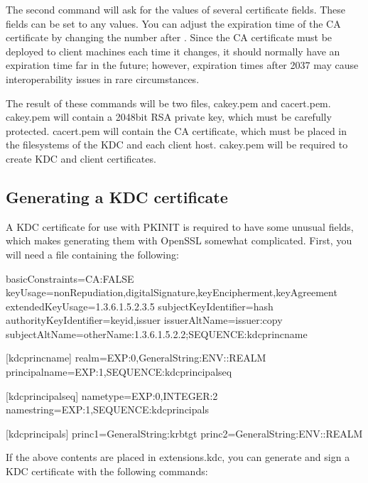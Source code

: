 \documentclass[letterpaper,10pt,english]{sphinxmanual}
\begin{document}
\sphinxAtStartPar
The second command will ask for the values of several certificate
fields.  These fields can be set to any values.  You can adjust the
expiration time of the CA certificate by changing the number after
.  Since the CA certificate must be deployed to client
machines each time it changes, it should normally have an expiration
time far in the future; however, expiration times after 2037 may cause
interoperability issues in rare circumstances.

\sphinxAtStartPar
The result of these commands will be two files, cakey.pem and
cacert.pem.  cakey.pem will contain a 2048\sphinxhyphen{}bit RSA private key, which
must be carefully protected.  cacert.pem will contain the CA
certificate, which must be placed in the filesystems of the KDC and
each client host.  cakey.pem will be required to create KDC and client
certificates.


\subsection{Generating a KDC certificate}
\label{\detokenize{admin/pkinit:generating-a-kdc-certificate}}
\sphinxAtStartPar
A KDC certificate for use with PKINIT is required to have some unusual
fields, which makes generating them with OpenSSL somewhat complicated.
First, you will need a file containing the following:

\begin{sphinxVerbatim}
basicConstraints=CA:FALSE
keyUsage=nonRepudiation,digitalSignature,keyEncipherment,keyAgreement
extendedKeyUsage=1.3.6.1.5.2.3.5
subjectKeyIdentifier=hash
authorityKeyIdentifier=keyid,issuer
issuerAltName=issuer:copy
subjectAltName=otherName:1.3.6.1.5.2.2;SEQUENCE:kdc\PYGZus{}princ\PYGZus{}name

[kdc\PYGZus{}princ\PYGZus{}name]
realm=EXP:0,GeneralString:\PYGZdl{}\PYGZob{}ENV::REALM\PYGZcb{}
principal\PYGZus{}name=EXP:1,SEQUENCE:kdc\PYGZus{}principal\PYGZus{}seq

[kdc\PYGZus{}principal\PYGZus{}seq]
name\PYGZus{}type=EXP:0,INTEGER:2
name\PYGZus{}string=EXP:1,SEQUENCE:kdc\PYGZus{}principals

[kdc\PYGZus{}principals]
princ1=GeneralString:krbtgt
princ2=GeneralString:\PYGZdl{}\PYGZob{}ENV::REALM\PYGZcb{}
\end{sphinxVerbatim}

\sphinxAtStartPar
If the above contents are placed in extensions.kdc, you can generate
and sign a KDC certificate with the following commands:
\end{document}
